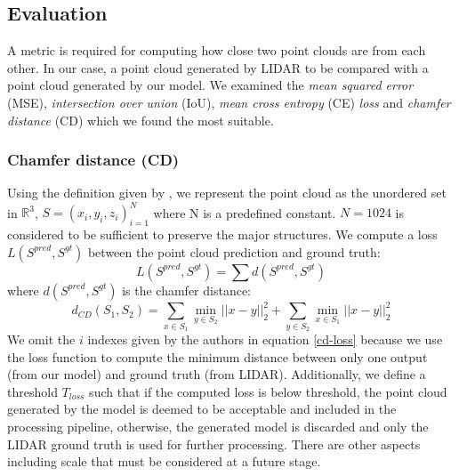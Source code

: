 
\subsection{Evaluation}
\label{Evaluation}

A metric is required for computing how close two point clouds are from each other. In our case, a point cloud generated by LIDAR to be compared with a point cloud generated by our model.  
We examined the \textit{mean squared error} (MSE), \textit{intersection over union} (IoU), \textit{mean cross entropy} (CE) \textit{loss} and \textit{chamfer distance} (CD) which we found the most suitable.  

\subsubsection{Chamfer distance (CD)}

Using the definition given by \cite{fan2016point}, we represent the point cloud as the unordered set in $\mathbb{R}^3$, $S = {(x_i,y_i,z_i)}_{i=1}^N$ where N is a predefined constant. $N=1024$ is considered to be sufficient to preserve the major structures.  
We compute a loss $L(S^{pred},S^{gt})$ between the point cloud prediction and ground truth:
\begin{equation}
\label{cd-loss}
L(S^{pred},S^{gt})  = \sum d(S^{pred},S^{gt})
\end{equation}
where $d(S^{pred},S^{gt})$ is the chamfer distance:
\begin{equation}
    d_{CD}(S_1,S_2) = \sum_{x \in S_1} \min_{y \in S_2} ||x-y||_2^2 + \sum_{y \in S_2} \min_{x \in S_1} ||x-y||_2^2
\end{equation}
We omit the $i$ indexes given by the authors in equation \ref{cd-loss} because we use the loss function to compute the minimum distance between only one output (from our model) and ground truth (from LIDAR). Additionally, we define a threshold $T_{loss}$ such that if the computed loss is below threshold, the point cloud generated by the model is deemed to be acceptable and included in the processing pipeline, otherwise, the generated model is discarded and only the LIDAR ground truth is used for further processing.  
There are other aspects including scale that must be considered at a future stage.